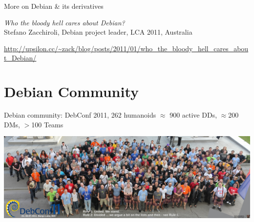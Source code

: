 \documentclass[]{beamer}
\begin{document}
\begin{frame}{More on Debian \& its derivatives}

\emph{Who the bloody hell cares about Debian?}\\
Stefano Zacchiroli, Debian project leader, LCA 2011, Australia\\
\begin{tiny}\url{http://upsilon.cc/~zack/blog/posts/2011/01/who_the_bloody_hell_cares_about_Debian/}
\end{tiny}

\end{frame}

\section{Debian Community}

\begin{frame}[t]{Debian community: DebConf 2011, 262 humanoids}
$\approx$ 900 active \alert{DDs}, $\approx$200 \alert{DMs}, $>$100 Teams
\begin{center}
\includegraphics[width=\linewidth]{Dc11group_1024}
\end{center}
\end{frame}
\end{document}
